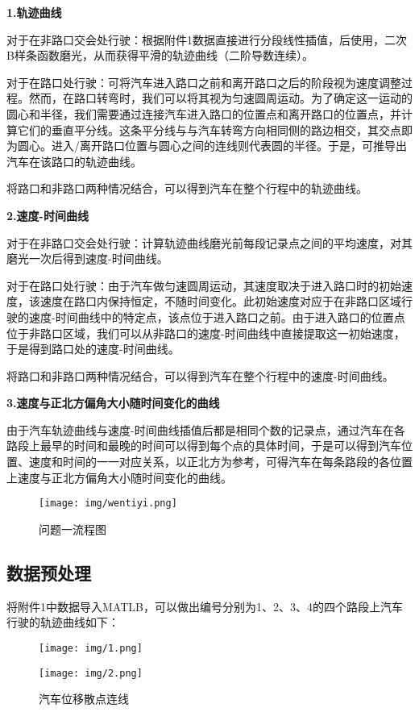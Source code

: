 \documentclass[withoutpreface,bwprint]{cumcmthesis} %
\begin{document}
\textbf{1.轨迹曲线}

对于在非路口交会处行驶：根据附件1数据直接进行分段线性插值，后使用，二次B样条函数磨光，从而获得平滑的轨迹曲线（二阶导数连续）。

对于在路口处行驶：可将汽车进入路口之前和离开路口之后的阶段视为速度调整过程。然而，在路口转弯时，我们可以将其视为匀速圆周运动。为了确定这一运动的圆心和半径，我们需要通过连接汽车进入路口的位置点和离开路口的位置点，并计算它们的垂直平分线。这条平分线与与汽车转弯方向相同侧的路边相交，其交点即为圆心。进入/离开路口位置与圆心之间的连线则代表圆的半径。于是，可推导出汽车在该路口的轨迹曲线。

将路口和非路口两种情况结合，可以得到汽车在整个行程中的轨迹曲线。

\textbf{2.速度-时间曲线}

对于在非路口交会处行驶：计算轨迹曲线磨光前每段记录点之间的平均速度，对其磨光一次后得到速度-时间曲线。

对于在路口处行驶：由于汽车做匀速圆周运动，其速度取决于进入路口时的初始速度，该速度在路口内保持恒定，不随时间变化。此初始速度对应于在非路口区域行驶的速度-时间曲线中的特定点，该点位于进入路口之前。由于进入路口的位置点位于非路口区域，我们可以从非路口的速度-时间曲线中直接提取这一初始速度，于是得到路口处的速度-时间曲线。

将路口和非路口两种情况结合，可以得到汽车在整个行程中的速度-时间曲线。

\textbf{3.速度与正北方偏角大小随时间变化的曲线}

由于汽车轨迹曲线与速度-时间曲线插值后都是相同个数的记录点，通过汽车在各路段上最早的时间和最晚的时间可以得到每个点的具体时间，于是可以得到汽车位置、速度和时间的一一对应关系，以正北方为参考，可得汽车在每条路段的各位置上速度与正北方偏角大小随时间变化的曲线。

\begin{figure}[htbp]
  	\centering
  	\texttt{[image: img/wentiyi.png]}
   \captionsetup{font=small, position=below}
  	\caption{问题一流程图}
  \end{figure}

\subsection{数据预处理}

将附件1中数据导入MATLB，可以做出编号分别为1、2、3、4的四个路段上汽车行驶的轨迹曲线如下：
\begin{figure}[htbp]
    \centering
    \texttt{[image: img/1.png]}
\end{figure}
\begin{figure}[htbp]
    \centering
    \texttt{[image: img/2.png]}
     \captionsetup{font=small, position=below}
    \caption{汽车位移散点连线}
\end{figure}
\end{document}

